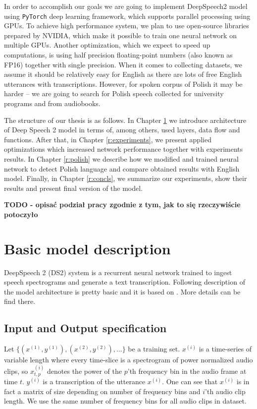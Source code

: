 \documentclass[licencjacka,en]{pracamgr}
\begin{document}
In order to accomplish our goals we are going to implement DeepSpeech2 model using \texttt{PyTorch} deep learning framework, which supports parallel processing using GPUs. To achieve high performance system, we plan to use open-source libraries prepared by NVIDIA, which make it possible to train one neural network on multiple GPUs. Another optimization, which we expect to speed up computations, is using half precision floating-point numbers (also known as FP16) together with single precision. When it comes to collecting datasets, we assume it should be relatively easy for English as there are lots of free English utterances with transcriptions. However, for spoken corpus of Polish it may be harder -- we are going to search for Polish speech collected for university programs and from audiobooks.

The structure of our thesis is as follows. In Chapter \ref{r:desc} we introduce architecture of Deep Speech 2 model in terms of, among others, used layers, data flow and functions. After that, in Chapter \ref{r:experiments}, we present applied optimizations which increased network performance together with experiments results. In Chapter \ref{r:polish} we describe how we modified and trained neural network to detect Polish language and compare obtained results with English model. Finally, in Chapter \ref{r:concls}, we summarize our experiments, show their results and present final version of the model.

\textbf{TODO - opisać podział pracy zgodnie z tym, jak to się rzeczywiście potoczyło}

\chapter{Basic model description}\label{r:desc}

DeepSpeech 2 (DS2) system is a recurrent neural network trained to ingest speech spectrograms and generate a text transcription.
Following description of the model architecture is pretty basic and it is based on \cite{DS2}. More details can be find there.

\section{Input and Output specification} \label{sec:input}
Let $\{(x^{(1)}, y^{(1)}), (x^{(2)}, y^{(2)}), ...\}$ be a training set. $x^{(i)}$ is a time-series of variable length where every time-slice is a spectrogram of power
normalized audio clips, so $x^{(i)}_{t,p}$ denotes the power of the $p$’th frequency bin in the audio frame at time $t$. $y^{(i)}$ is a transcription of the utterance $x^{(i)}$. One can see that $x^{(i)}$ is in fact a matrix of size depending on number of frequency bins and $i$'th audio clip length. We use the same number of frequency bins for all audio clips in dataset.
\end{document}
